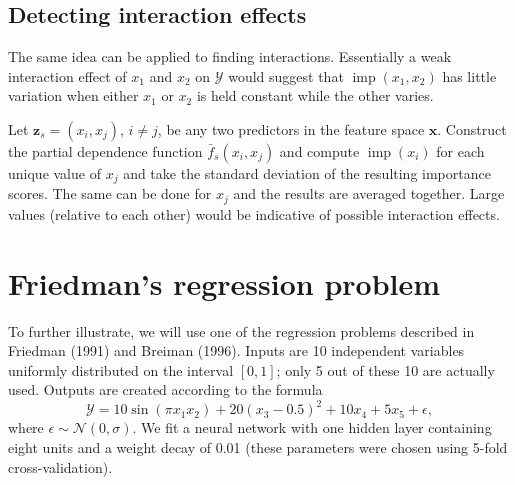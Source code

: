 \documentclass[12pt]{article}
\def\ref#1{\textbf{(#1)}}
\DeclareMathOperator{\imp}{imp}
\begin{document}
\subsection{Detecting interaction effects}
\label{sec:interaction}

The same idea can be applied to finding interactions. Essentially a weak interaction effect of $x_1$ and $x_2$ on $\mathcal{Y}$ would suggest that $\imp\left(x_1, x_2\right)$ has little variation when either $x_1$ or $x_2$ is held constant while the other varies. 

Let $\boldsymbol{z}_s = \left(x_i, x_j\right)$, $i \neq j$, be any two predictors in the feature space $\boldsymbol{x}$. Construct the partial dependence function $\bar{f}_s\left(x_i, x_j\right)$ and compute $\imp\left(x_i\right)$ for each unique value of $x_j$ and take the standard deviation of the resulting importance scores. The same can be done for $x_j$ and the results are averaged together. Large values (relative to each other) would be indicative of possible interaction effects. 


\section{Friedman's regression problem}

To further illustrate, we will use one of the regression problems described in Friedman (1991) and Breiman (1996). Inputs are 10 independent variables uniformly distributed on the interval $\left[0, 1\right]$; only 5 out of these 10 are actually used. Outputs are created according to the formula
\begin{equation}
\mathcal{Y} = 10 \sin\left(\pi x_1 x_2\right) + 20 \left(x_3 - 0.5\right) ^ 2 + 10 x_4 + 5 x_5 + \epsilon,
\end{equation}
where $\epsilon \sim \mathcal{N}\left(0, \sigma\right)$. We fit a neural network with one hidden layer containing eight units and a weight decay of 0.01 (these parameters were chosen using 5-fold cross-validation). %
\end{document}
